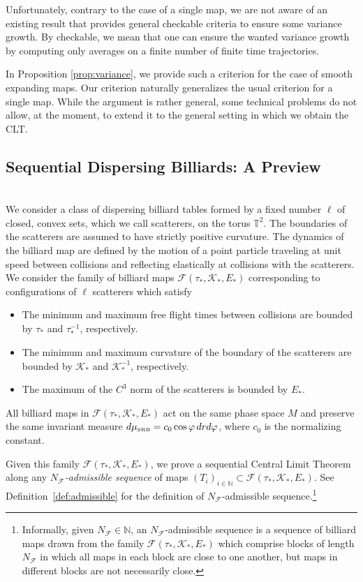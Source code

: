 \documentclass{amsart}
\numberwithin{equation}{section}
\newcommand\cF{{\mathcal F}}
\newcommand\cK{{\mathcal K}}
\newcommand\vf{\varphi}
\newcommand{\musrb}{\mu_{\mbox{\tiny SRB}}}
\begin{document}
 Unfortunately, contrary to the case of a single map, we are not aware of an existing result that provides general checkable criteria to ensure some variance growth. By checkable, we mean that one can ensure the wanted variance growth by computing only averages on a finite number of finite time trajectories.
 
 In Proposition \ref{prop:variance}, we provide such a criterion for the case of smooth expanding maps. Our criterion naturally generalizes the usual criterion for a single map. While the argument is rather general, some technical problems do not allow, at the moment, to extend it to the general setting in which we obtain the CLT.
 
\subsection{Sequential Dispersing Billiards: A Preview}\ \\
We consider a class of dispersing billiard tables formed by a fixed number $\ell$ of closed, convex sets, which we call scatterers, on the
torus $\mathbb{T}^2$.  The boundaries of the scatterers are assumed to have strictly positive curvature.  
The dynamics of the billiard map are defined by the motion of a point particle traveling at unit speed between collisions
and reflecting elastically at collisions with the scatterers.
We consider 
the family of billiard maps $\cF(\tau_*, \cK_*, E_*)$ corresponding to configurations of $\ell$ scatterers which satisfy
\begin{itemize}
  \item The minimum and maximum free flight times between collisions are bounded by $\tau_*$ and $\tau_*^{-1}$, respectively.  
  \item The minimum and maximum curvature of the boundary of the scatterers are bounded by $\cK_*$ and
  $\cK_*^{-1}$, respectively.
  \item The maximum of the $C^3$ norm of the scatterers is bounded by $E_*$.
\end{itemize}
All billiard maps in $\cF(\tau_*, \cK_*, E_*)$ act on the same phase space $M$ and preserve the same invariant
measure $d\musrb = c_0 \cos \vf \, drd\vf$, where $c_0$ is the normalizing constant.

Given this family $\cF(\tau_*, \cK_*, E_*)$, we  prove a sequential Central Limit Theorem
along any {\em $N_{\cF}$-admissible sequence} of maps $( T_i )_{i \in \mathbb{N}} \subset \cF(\tau_*, \cK_*, E_*)$.
See Definition~\ref{def:admissible} for the definition of $N_{\cF}$-admissible sequence.\footnote{Informally,
given $N_{\cF} \in \mathbb{N}$,
an $N_{\cF}$-admissible sequence is a sequence of billiard maps drawn from the family $\cF(\tau_*, \cK_*, E_*)$
which comprise blocks of length $N_{\cF}$ in which all maps in each block are close to one another, but maps in different blocks are not necessarily close.}
\end{document}
